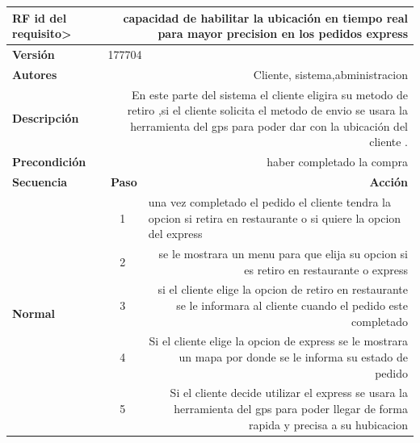 \documentclass[conference]{IEEEtran}
\begin{document}
\begin{table}[H]
  \centering
   \begin{adjustbox}{width=0.45\textwidth}
    \begin{tabular}{|p{11.215em}|r|r|}
    \toprule
    \textbf{RF id del requisito>} & \multicolumn{2}{p{37.355em}|}{\textbf{capacidad de habilitar la ubicación en tiempo real para mayor precision en los pedidos express }} \\
    \midrule
    \textbf{Versión} & \multicolumn{2}{l|}{177704} \\
    \midrule
    \textbf{Autores} & \multicolumn{2}{p{37.355em}|}{Cliente, sistema,abministracion } \\
    \midrule
    \textbf{Descripción} & \multicolumn{2}{p{37.355em}|}{En este parte del sistema el cliente eligira su metodo de retiro ,si el cliente solicita el metodo de envio  se usara la herramienta del gps para poder dar con la ubicación del cliente . } \\
    \midrule
    \textbf{Precondición} & \multicolumn{2}{p{37.355em}|}{haber completado la compra } \\
    \midrule
    \textbf{Secuencia} & \multicolumn{1}{p{5.355em}|}{\textbf{Paso}} & \multicolumn{1}{p{32em}|}{\textbf{Acción}} \\
    \midrule
    \multirow{7}[12]{*}{\textbf{Normal}} & \multicolumn{1}{c|}{\multirow{2}[2]{*}{1}} & \multicolumn{1}{l|}{\multirow{2}[2]{*}{una vez completado el pedido el cliente tendra la opcion si  retira en restaurante o si quiere la opcion del express }} \\
    \multicolumn{1}{|c|}{} &       &  \\
\cmidrule{2-3}    \multicolumn{1}{|c|}{} & \multicolumn{1}{c|}{2} & \multicolumn{1}{p{32em}|}{se le mostrara un menu para que elija su opcion si es retiro en restaurante o express} \\
\cmidrule{2-3}    \multicolumn{1}{|c|}{} & \multicolumn{1}{c|}{3} & \multicolumn{1}{p{32em}|}{si el cliente elige la opcion de retiro en restaurante se le informara al cliente cuando el pedido este completado } \\
\cmidrule{2-3}    \multicolumn{1}{|c|}{} & \multicolumn{1}{c|}{4} & \multicolumn{1}{p{32em}|}{Si el cliente elige la opcion de express se le mostrara un mapa por donde se le informa su estado de pedido } \\
\cmidrule{2-3}    \multicolumn{1}{|c|}{} & \multicolumn{1}{c|}{5} & \multicolumn{1}{p{32em}|}{Si el cliente decide utilizar el express se usara la herramienta del gps para poder llegar de forma rapida y precisa a su hubicacion } \\

\end{tabular}
\end{adjustbox}
\end{table}
\end{document}
